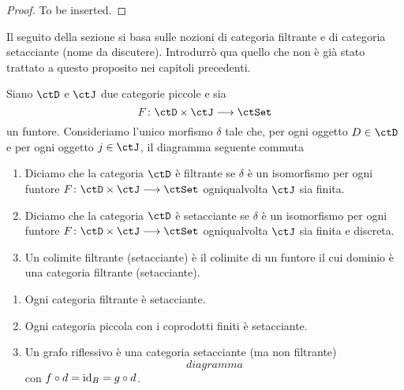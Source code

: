 \begin{proof}
	To be inserted.
\end{proof}

\begin{warning}\label{caveat_filtr_sift}
	Il seguito della sezione si basa sulle nozioni di categoria filtrante e di categoria setacciante (nome da discutere). Introdurrò qua
	quello che non è già stato trattato a questo proposito nei capitoli precedenti.
\end{warning}

\begin{definition}\label{def_filtr_sift}
	Siano \(\ctD\) e \(\ctJ\) due categorie piccole e sia
	\[
		F \colon \ctD \times \ctJ \fun \ctSet
	\]
	un funtore. Consideriamo l'unico morfismo \(\delta\) tale che, per ogni oggetto \(D \in \ctD\) e per ogni oggetto \(j \in \ctJ\), il diagramma
	seguente commuta
	\(\)\(\)
	\begin{enumerate}
		\item Diciamo che la categoria \(\ctD\) è filtrante se \(\delta\) è un isomorfismo per ogni funtore \(F \colon \ctD \times \ctJ \fun \ctSet\)
		      ogniqualvolta \(\ctJ\) sia finita.
		\item Diciamo che la categoria \(\ctD\) è setacciante se \(\delta\) è un isomorfismo per ogni funtore \(F \colon \ctD \times \ctJ \fun \ctSet\)
		      ogniqualvolta \(\ctJ\) sia finita e discreta.
		\item Un colimite filtrante (setacciante) è il colimite di un funtore il cui dominio è una categoria filtrante (setacciante).
	\end{enumerate}
\end{definition}

\begin{examples}\label{esempi_cat_fltr_set}
	\hfill
	\begin{enumerate}
		\item Ogni categoria filtrante è setacciante.
		\item Ogni categoria piccola con i coprodotti finiti è setacciante.
		\item Un grafo riflessivo è una categoria setacciante (ma non filtrante)
		      \[
			      diagramma
		      \]
		      con \(f \circ d = \mathrm{id}_B = g \circ d\).
	\end{enumerate}
\end{examples}

